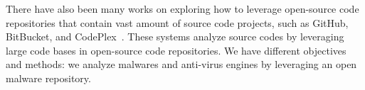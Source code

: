 There have also been many works on exploring how to leverage open-source code repositories that contain vast amount of source code projects, 
such as GitHub, BitBucket, and CodePlex~\cite{code-completion,big-predicting,big-translation}. 
These systems analyze source codes by leveraging large code bases in open-source code repositories.
We have different objectives and methods: 
we analyze malwares and anti-virus engines by leveraging an open malware repository.


